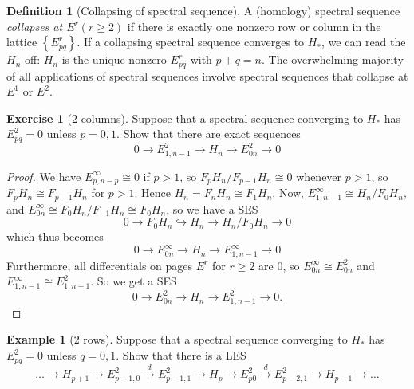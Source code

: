 \documentclass[reqno]{amsart}
\theoremstyle{definition}
\newtheorem{definition}[theorem]{Definition}
\newtheorem{example}[theorem]{Example}
\newtheorem{exercise}[theorem]{Exercise}
\theoremstyle{remark}
\begin{document}
    \begin{definition}[Collapsing of spectral sequence]
        A (homology) spectral sequence
        \textit{collapses at $E^{r} (r \ge 2)$} if there
        is exactly one nonzero row or column in the lattice
        $\left\{ E_{pq}^{r} \right\} $. If a collapsing spectral
        sequence converges to $H_*$, we can read the $H_n$ off:
        $H_n$ is the unique nonzero $E_{pq}^{r}$ with
        $p+q=n$. The overwhelming majority of all applications
        of spectral sequences involve spectral sequences
        that collapse at $E^{1}$ or $E^2$.
    \end{definition}

    \begin{exercise}[2 columns]
        Suppose that a spectral sequence
        converging to $H_*$ has $E_{pq}^2 = 0$ unless
        $p = 0,1$. Show that there are exact sequences
        \[
        0 \to E_{1, n-1}^2 \to H_n \to E_{0n}^2 \to 0
        \] 
    \end{exercise}

    \begin{proof}
        We have $E_{p,n-p}^{\infty} \cong 0$ if
        $p>1$, so
        $F_{p}H_n / F_{p-1} H_n \cong 0$ whenever
        $p>1$, so
        $F_p H_n \cong F_{p-1} H_n$ for $p>1$.
        Hence $H_n = F_n H_n \cong F_1 H_n$.  
        Now, $E_{1,n-1}^{\infty} \cong
        H_n / F_0 H_n$, and
        $E_{0n}^{\infty} \cong
        F_0 H_n / F_{-1} H_n \cong
        F_0 H_n$, so
        we have a SES
        \[
        0 \to F_0 H_n \hookrightarrow  H_n \to H_n / F_0 H_n \to 0
        \] 
        which thus becomes
        \[
        0 \to E_{0n}^{\infty} \to 
        H_n \to E_{1,n-1}^{\infty} \to 0
        \] 
        Furthermore, all differentials on pages
        $E^{r}$ for $r\ge 2$ are $0$, so
        $E_{0n}^{\infty} \cong
        E_{0n}^2$ and
        $E_{1,n-1}^{\infty} \cong
        E_{1,n-1}^{2}$.
        So we get
        a SES
        \[
        0 \to E_{0n}^2 \to H_n \to E_{1,n-1}^2 \to 0.
        \]
    \end{proof}


    \begin{example}[2 rows]
        Suppose that a spectral sequence
        converging to $H_*$ has $E_{pq}^2 = 0$ unless
        $q = 0,1$. Show that there is a LES
        \[
        \ldots \to H_{p+1} \to E_{p+1,0}^2
        \stackrel{d}{\to} E_{p-1,1}^2 \to H_p
        \to E_{p 0}^2 \stackrel{d}{\to} 
        E_{p-2,1}^2 \to H_{p-1} \to \ldots
        \] 
    \end{example}
\end{document}
